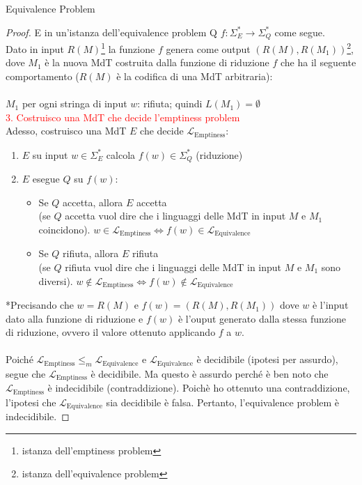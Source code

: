 \documentclass{article}  %
\theoremstyle{definition}
\begin{document}
\begin{theorem}{Equivalence Problem}
\begin{proof}
{    E in un'istanza dell'equivalence problem Q}
     $f: \Sigma_E^* \rightarrow \Sigma_Q^*$ come segue. \\
    Dato in input $R(M)$\footnote{istanza dell'emptiness problem}  la funzione $f$ genera come output $(R(M),R(M_1))$\footnote
    {istanza dell'equivalence problem}, dove $M_1$ è la nuova MdT costruita dalla funzione di riduzione $f$ che ha il seguente 
    comportamento ($R(M)$ è la codifica di una MdT arbitraria):\\ \\ $M_1$ per ogni stringa di input $w$: rifiuta; quindi $L(M_1)=\emptyset$ \\
    \textcolor{red}{3. Costruisco una MdT che decide l'emptiness problem} \\
    Adesso, costruisco una MdT $E$ che decide $\mathcal{L}_{\text{Emptiness}}$:
    \begin{enumerate}
      \item $E$ su input $w \in \Sigma_E^*$ calcola $f(w) \in \Sigma_Q^*$ (riduzione)
      \item $E$ esegue $Q$ su $f(w)$:
      \begin{itemize}
        \item Se $Q$ accetta, allora $E$ accetta \\
        (se $Q$ accetta vuol dire che i linguaggi delle MdT in input $M$ e $M_1$ coincidono). 
        $w \in \mathcal{L}_{\text{Emptiness}} \iff f(w) \in \mathcal{L}_{\text{Equivalence}}$

        \item Se $Q$ rifiuta, allora $E$ rifiuta \\
        (se $Q$ rifiuta vuol dire che i linguaggi delle MdT in input $M$ e $M_1$ sono diversi).
        $w \notin \mathcal{L}_{\text{Emptiness}} \iff f(w) \notin \mathcal{L}_{\text{Equivalence}}$
      \end{itemize}
    \end{enumerate}
    *Precisando che $w=R(M)$ e $f(w)=(R(M),R(M_1))$ dove $w$ è l'input dato alla funzione di riduzione e $f(w)$ è l'ouput 
    generato dalla stessa funzione di riduzione, ovvero il valore ottenuto applicando $f$ a $w$. \\ \\
    Poiché $\mathcal{L}_{\text{Emptiness}} \leq_m \mathcal{L}_{\text{Equivalence}}$ e $\mathcal{L}_{\text{Equivalence}}$ è decidibile (ipotesi per assurdo), segue 
    che $\mathcal{L}_{\text{Emptiness}}$ è decidibile.
    Ma questo è assurdo perché è ben noto che $\mathcal{L}_{\text{Emptiness}}$ è indecidibile (contraddizione). Poichè ho ottenuto una contraddizione, l'ipotesi che 
    $\mathcal{L}_{\text{Equivalence}}$ sia decidibile è falsa. Pertanto, l'equivalence problem è indecidibile.
  \end{proof}
\end{theorem}
\end{document}
